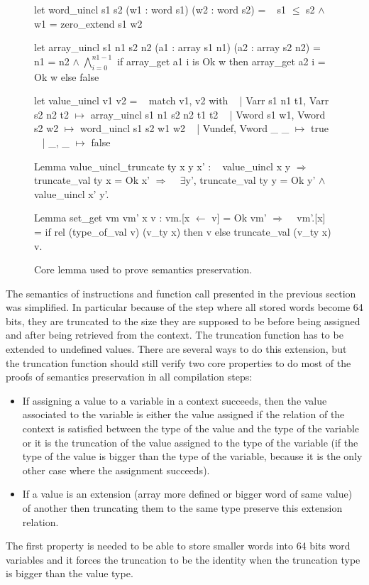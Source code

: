 \documentclass{article}
\begin{document}
\medskip

\begin{figure}[t]
\obeylines\obeyspaces\ttfamily%
let word\_uincl s1 s2 (w1 : word s1) (w2 : word s2) =
~ s1 \(\leq\) s2 \(\wedge\) w1 = zero\_extend s1 w2

let array\_uincl s1 n1 s2 n2 (a1 : array s1 n1) (a2 : array s2 n2) =
~ n1 = n2 \(\wedge\;\bigwedge_{i = 0}^{n1 - 1}\) if array\_get a1 i is Ok w then array\_get a2 i = Ok w else false

let value\_uincl v1 v2 =
~ match v1, v2 with
~ | Varr s1 n1 t1, Varr s2 n2 t2 \(\mapsto\) array\_uincl s1 n1 s2 n2 t1 t2
~ | Vword s1 w1,   Vword s2 w2   \(\mapsto\) word\_uincl s1 s2 w1 w2
~ | Vundef,        Vword \_ \_     \(\mapsto\) true
~ | \_,             \_             \(\mapsto\) false

Lemma value\_uincl\_truncate ty x y x' :
~ value\_uincl x y \(\Longrightarrow\) truncate\_val ty x = Ok x' \(\Longrightarrow\)
~ \(\exists\)y', truncate\_val ty y = Ok y' \(\wedge\) value\_uincl x' y'.

Lemma set\_get vm vm' x v : vm.[x \(\gets\) v] = Ok vm' \(\Longrightarrow\)
~ vm'.[x] = if rel (type\_of\_val v) (v\_ty x) then v else truncate\_val (v\_ty x) v.
\normalfont%
\caption{Core lemma used to prove semantics preservation.}
\end{figure}

The semantics of instructions and function call presented in the previous section
was simplified. In particular because of the step where all stored words become
64 bits, they are truncated to the size they are supposed to be before being
assigned and after being retrieved from the context. The truncation function
has to be extended to undefined values. There are several ways to do this
extension, but the truncation function should still verify two core properties
to do most of the proofs of semantics preservation in all compilation steps:
\begin{itemize}
\item If assigning a value to a variable in a context succeeds, then the value
  associated to the variable is either the value assigned if the relation of the
  context is satisfied between the type of the value and the type of the
  variable or it is the truncation of the value assigned to the type of the
  variable (if the type of the value is bigger than the type of the variable,
  because it is the only other case where the assignment succeeds).
\item If a value is an extension (array more defined or bigger word of same
  value) of another then truncating them to the same type preserve this
  extension relation.
\end{itemize}
The first property is needed to be able to store smaller words into 64 bits word
variables and it forces the truncation to be the identity when the truncation
type is bigger than the value type.
\end{document}
